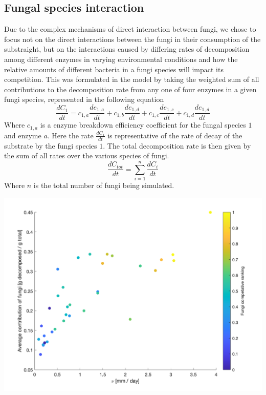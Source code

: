 \documentclass[12pt]{article}
\newenvironment{ColumnFigure}
{\par\medskip\noindent\minipage{\linewidth}}
{\endminipage\par\medskip}
\begin{document}
\begin{multicols}{2}
\section*{Fungal species interaction}
Due to the complex mechanisms of direct interaction between fungi, we chose to focus not on the direct interactions between the fungi in their consumption of the substraight, but on the interactions caused by differing rates of decomposition among different enzymes in varying environmental conditions and how the relative amounts of different bacteria in a fungi species will impact its competition. This was formulated in the model by taking the weighted sum of all contributions to the decomposition rate from any one of four enzymes in a given fungi species, represented in the following equation
\begin{equation} \label{eq}
\frac{dC_{1}}{dt} = c_{1,a}\frac{de_{1,a}}{dt} + c_{1,b}\frac{de_{1,d}}{dt} + c_{1,c}\frac{de_{1,c}}{dt} + c_{1,d}\frac{de_{1,d}}{dt}
\end{equation}
Where $c_{1,a}$ is a enzyme breakdown efficiency coefficient for the fungal species $1$ and enzyme $a$. Here the rate $\frac{dC_{1}}{dt}$ is representative of the rate of decay of the substrate by the fungi species $1$. The total decomposition rate is then given by the sum of all rates over the various species of fungi.
\begin{equation} \label{eq}
\frac{dC_{tot}}{dt} = \sum_{i=1}^{n}\frac{dC_{i}}{dt}
\end{equation}
Where $n$ is the total number of fungi being simulated. 


\begin{ColumnFigure}
	\centering
	\includegraphics[width=\linewidth]{avg_contr_nu_competative_rankings.png}
\end{ColumnFigure}



\end{multicols}
\end{document}
